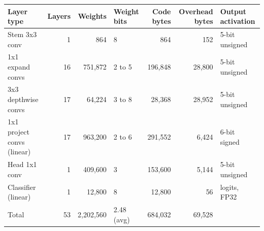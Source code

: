 \begin{tabular}{lrrlrrl}
\toprule
Layer type & Layers & Weights & Weight bits & Code bytes & Overhead bytes & Output activation \\
\midrule
Stem 3x3 conv & 1 & 864 & 8 & 864 & 152 & 5-bit unsigned \\
1x1 expand convs & 16 & 751,872 & 2 to 5 & 196,848 & 28,800 & 5-bit unsigned \\
3x3 depthwise convs & 17 & 64,224 & 3 to 8 & 28,368 & 28,952 & 5-bit unsigned \\
1x1 project convs (linear) & 17 & 963,200 & 2 to 6 & 291,552 & 6,424 & 6-bit signed \\
Head 1x1 conv & 1 & 409,600 & 3 & 153,600 & 5,144 & 5-bit unsigned \\
Classifier (linear) & 1 & 12,800 & 8 & 12,800 & 56 & logits, FP32 \\
\midrule
Total & 53 & 2,202,560 & 2.48 (avg) & 684,032 & 69,528 & \\
\bottomrule
\end{tabular}
